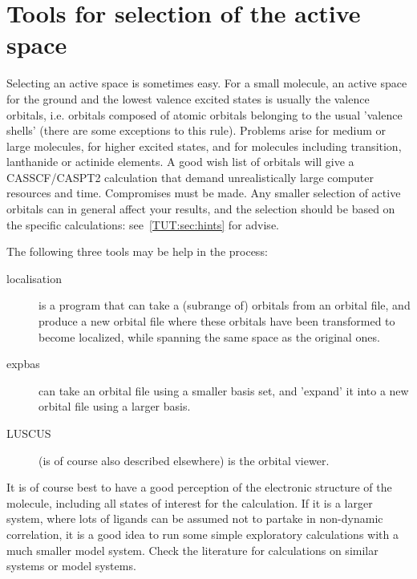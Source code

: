 
\section{Tools for selection of the active space} 
\label{TUT:sec:tools}

Selecting an active space is sometimes easy. For a small molecule,
an active space for the ground and the lowest valence excited states
is usually the valence orbitals, i.e. orbitals composed of atomic
orbitals belonging to the usual 'valence shells' (there are
some exceptions to this rule). Problems arise for medium or large
molecules, for higher excited states, and for molecules including
transition, lanthanide or actinide elements. A good wish list
of orbitals will give a CASSCF/CASPT2 calculation that demand
unrealistically large computer resources and time.
Compromises must be made. Any smaller selection of active orbitals
can in general affect your results, and the selection should be
based on the specific calculations: see~\ref{TUT:sec:hints} for
advise.

The following three tools may be help in the process:

\begin{description}
\item[localisation]  is a program that can take a (subrange of) orbitals
from an orbital file, and produce a new orbital file where these orbitals
have been transformed to become localized, while spanning the same space
as the original ones.
\item[expbas]  can take an orbital file using a smaller basis set, and
'expand' it into a new orbital file using a larger basis.
\item[LUSCUS]  (is of course also described elsewhere) is the orbital viewer.
\end{description}

It is of course best to have a good perception of the electronic structure
of the molecule, including all states of interest for the calculation.
If it is a larger system, where lots of ligands can be assumed not to
partake in non-dynamic correlation, it is a good idea to run some simple
exploratory calculations with a much smaller model system.
Check the literature for calculations on similar systems or model systems.

